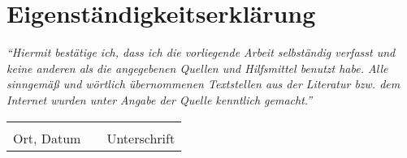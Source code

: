\chapter*{Eigenständigkeitserklärung}

\emph{``Hiermit bestätige ich, dass ich die vorliegende Arbeit selbständig verfasst und keine
anderen als die angegebenen Quellen und Hilfsmittel benutzt habe. 
\newline
Alle sinngemäß und wörtlich übernommenen Textstellen aus der Literatur bzw. dem Internet wurden unter Angabe der Quelle kenntlich gemacht.''}


\bigskip


\begin{tabular}{lp{2em}l}
 \hspace{4cm}   && \hspace{6cm} \\\cline{1-1}\cline{3-3}
 Ort, Datum     && Unterschrift
\end{tabular}
